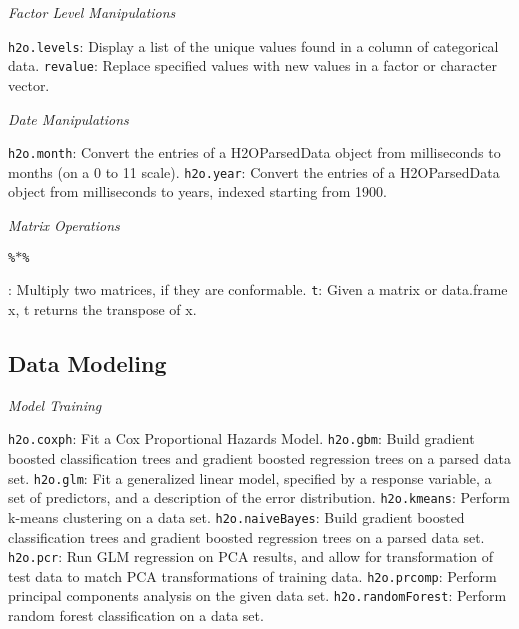{{\emph{Factor Level Manipulations}\par
{\texttt{h2o.levels}}: Display a list of the unique values found in a column of categorical data. \newline
{\texttt{revalue}}: Replace specified values with new values in a factor or character vector.\newline%

\emph{Date Manipulations}\par
{\texttt{h2o.month}}: Convert the entries of a H2OParsedData object from milliseconds to months (on a 0 to 11 scale). \newline
{\texttt{h2o.year}}: Convert the entries of a H2OParsedData object from milliseconds to years, indexed starting from 1900.\newline

\emph{Matrix Operations}\par
{\texttt{\%$*$\%}}}: Multiply two matrices, if they are conformable.\newline
{\texttt{t}}: Given a matrix or data.frame x, t returns the transpose of x.\newline%

\subsection{Data Modeling}

\emph{Model Training}\par
{\texttt{h2o.coxph}}: Fit a Cox Proportional Hazards Model. \newline%
{\texttt{h2o.gbm}}: Build gradient boosted classification trees and gradient boosted regression trees on a parsed data set. \newline
{\texttt{h2o.glm}}: Fit a generalized linear model, specified by a response variable, a set of predictors, and a description of the error distribution. \newline
{\texttt{h2o.kmeans}}: Perform k-means clustering on a data set. \newline
{\texttt{h2o.naiveBayes}}: Build gradient boosted classification trees and gradient boosted regression trees on a parsed data set.\newline
{\texttt{h2o.pcr}}: Run GLM regression on PCA results, and allow for transformation of test data to match PCA transformations of training data. \newline%
{\texttt{h2o.prcomp}}: Perform principal components analysis on the given data set. \newline
{\texttt{h2o.randomForest}}: Perform random forest classification on a data set.\newline

}
